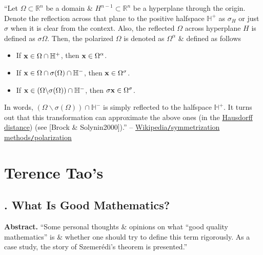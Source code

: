 \documentclass[oneside]{book}
\numberwithin{equation}{section}
\begin{document}
``Let $\Omega\subset\mathbb{R}^n$ be a domain \& $H^{n-1}\subset\mathbb{R}^n$ be a hyperplane through the origin. Denote the reflection across that plane to the positive halfspace $\mathbb{H}^+$ as $\sigma_H$ or just $\sigma$ when it is clear from the context. Also, the reflected $\Omega$ across hyperplane $H$ is defined as $\sigma\Omega$. Then, the polarized $\Omega$ is denoted as $\Omega^\alpha$ \& defined as follows
\begin{itemize}
	\item If ${\bf x}\in\Omega\cap\mathbb{H}^+$, then ${\bf x}\in\Omega^\alpha$.
	\item If ${\bf x}\in\Omega\cap\sigma(\Omega)\cap\mathbb{H}^-$, then ${\bf x}\in\Omega^\sigma$.
	\item If ${\bf x}\in(\Omega\backslash\sigma(\Omega))\cap\mathbb{H}^-$, then $\sigma{\bf x}\in\Omega^\sigma$.
\end{itemize}
In words, $(\Omega\backslash\sigma(\Omega))\cap\mathbb{H}^-$ is simply reflected to the halfspace $\mathbb{H}^+$. It turns out that this transformation can approximate the above ones (in the \href{https://en.wikipedia.org/wiki/Hausdorff_distance}{Hausdorff distance}) (see [Brock \& Solynin2000]).'' -- \href{https://en.wikipedia.org/wiki/Symmetrization_methods#Polarization}{Wikipedia\texttt{/}symmetrization methods\texttt{/}polarization}


\chapter{Terence Tao's}

\section{\cite{Tao2007}. What Is Good Mathematics?}

\textbf{Abstract.} ``Some personal thoughts \& opinions on what ``good quality mathematics'' is \& whether one should try to define this term rigorously. As a case study, the story of Szemer\'edi's theorem is presented.''
\end{document}

